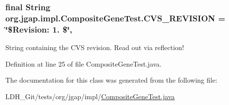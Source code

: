 \hypertarget{classorg_1_1jgap_1_1impl_1_1_composite_gene_test_a6c9038f49a9e63b96a7d6c41f6ec8b72}{
\subsubsection[{C\-V\-S\-\_\-\-R\-E\-V\-I\-S\-I\-O\-N}]{\setlength{\rightskip}{0pt plus 5cm}final String org.\-jgap.\-impl.\-Composite\-Gene\-Test.\-C\-V\-S\-\_\-\-R\-E\-V\-I\-S\-I\-O\-N = \char`\"{}\$Revision\-: 1. \$\char`\"{}\hspace{0.3cm}{\ttfamily [static]}, {\ttfamily [private]}}}\label{classorg_1_1jgap_1_1impl_1_1_composite_gene_test_a6c9038f49a9e63b96a7d6c41f6ec8b72}
String containing the C\-V\-S revision. Read out via reflection! 

Definition at line 25 of file Composite\-Gene\-Test.\-java.



The documentation for this class was generated from the following file\-:\begin{DoxyCompactItemize}
\item 
L\-D\-H\-\_\-\-Git/tests/org/jgap/impl/\hyperlink{_composite_gene_test_8java}{Composite\-Gene\-Test.\-java}\end{DoxyCompactItemize}

